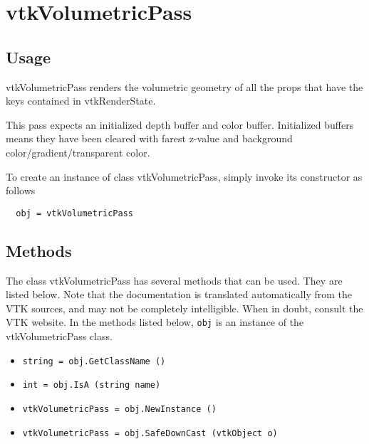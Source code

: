 \section{vtkVolumetricPass}

\subsection{Usage}

 vtkVolumetricPass renders the volumetric geometry of all the props that
 have the keys contained in vtkRenderState.

 This pass expects an initialized depth buffer and color buffer.
 Initialized buffers means they have been cleared with farest z-value and
 background color/gradient/transparent color.
 

To create an instance of class vtkVolumetricPass, simply
invoke its constructor as follows
\begin{verbatim}
  obj = vtkVolumetricPass
\end{verbatim}
\subsection{Methods}

The class vtkVolumetricPass has several methods that can be used.
  They are listed below.
Note that the documentation is translated automatically from the VTK sources,
and may not be completely intelligible.  When in doubt, consult the VTK website.
In the methods listed below, \verb|obj| is an instance of the vtkVolumetricPass class.
\begin{itemize}
\item  \verb|string = obj.GetClassName ()|

\item  \verb|int = obj.IsA (string name)|

\item  \verb|vtkVolumetricPass = obj.NewInstance ()|

\item  \verb|vtkVolumetricPass = obj.SafeDownCast (vtkObject o)|

\end{itemize}
